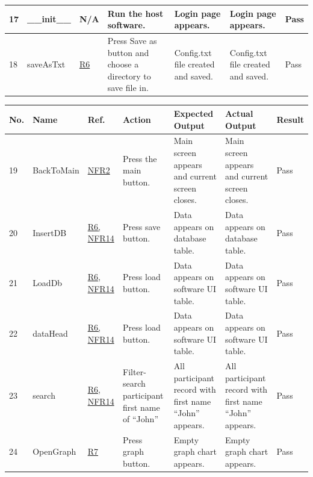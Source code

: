 \documentclass[12pt, titlepage]{article}
\begin{document}
\begin{center}
\begin{table} [H]
\begin{tabular}{ | p{0.5cm} | p{2.8cm} |  p{1.1cm} | p{2.7cm} | p{2.7cm} | p{2.7cm} | p{1.1cm} |}
\hline
17 & \_\_init\_\_ & N/A & Run the host software. & Login page appears. & Login page appears. & Pass \\ 
\hline
18 & saveAsTxt & \href{https://github.com/zakerl/Capstone_Project/blob/main/docs/SRS/SRS.pdf}{R6} & Press Save as button and choose a directory to save file in. & Config.txt file created and saved. & Config.txt file created and saved. & Pass \\ 
\hline
\end{tabular}
\end{table}
\end{center}

\begin{center}
\begin{table} [H]
\begin{tabular}{ | p{0.5cm} | p{2.8cm} |  p{1.1cm} | p{2.7cm} | p{2.7cm} | p{2.7cm} | p{1.1cm} |}
\hline
\textbf{No.} & \textbf{Name}  & \textbf{Ref.} & \textbf{Action} & \textbf{Expected Output} & \textbf{Actual Output} & \textbf{Result} \\
\hline
19 & BackToMain & \href{https://github.com/zakerl/Capstone_Project/blob/main/docs/SRS/SRS.pdf}{NFR2} & Press the main button. & Main screen appears and current screen closes. & Main screen appears and current screen closes. & Pass \\ 
\hline
20 &  InsertDB & \href{https://github.com/zakerl/Capstone_Project/blob/main/docs/SRS/SRS.pdf}{R6, NFR14} & Press save button. & Data appears on database table. & Data appears on database table. & Pass \\ 
\hline
21 & LoadDb & \href{https://github.com/zakerl/Capstone_Project/blob/main/docs/SRS/SRS.pdf}{R6, NFR14} & Press load button. & Data appears on software UI table. &  Data appears on software UI table. & Pass \\ 
\hline
22 & dataHead & \href{https://github.com/zakerl/Capstone_Project/blob/main/docs/SRS/SRS.pdf}{R6, NFR14} & Press load button. & Data appears on software UI table. & Data appears on software UI table. & Pass \\ 
\hline
23 & search & \href{https://github.com/zakerl/Capstone_Project/blob/main/docs/SRS/SRS.pdf}{R6, NFR14} & Filter-search participant first name of “John” & All participant record with first name “John” appears. & All participant record with first name “John” appears. & Pass \\ 
\hline
24 & OpenGraph & \href{https://github.com/zakerl/Capstone_Project/blob/main/docs/SRS/SRS.pdf}{R7} & Press graph button. & Empty graph chart appears. & Empty graph chart appears. & Pass \\ 

\end{tabular}
\end{table}
\end{center}
\end{document}
